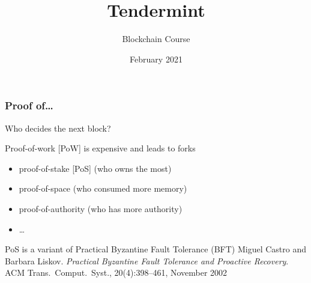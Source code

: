 \documentclass[11pt]{beamer}  %
\subtitle{Blockchain Course}
\title{Tendermint}
\institute{Universit\`a di Verona, Italy}
\date{February 2021}
\begin{document}
\begin{frame}
  \titlepage
\end{frame}

\begin{frame}
  \frametitle{Proof of\ldots}

  \begin{center}
    Who decides the next block?
  \end{center}

  \bigskip

  \begin{greenbox}{Proof-of-work [PoW] is expensive and leads to forks}
    \begin{itemize}
    \item proof-of-stake [PoS] (who owns the most)
    \item proof-of-space (who consumed more memory)
    \item proof-of-authority (who has more authority)
    \item \ldots
    \end{itemize}
  \end{greenbox}

  \bigskip

  \begin{greenbox}{PoS is a variant of Practical Byzantine Fault Tolerance (BFT)}
    Miguel Castro and Barbara Liskov.
    \emph{Practical Byzantine Fault Tolerance and Proactive Recovery}.
    ACM Trans.\ Comput.\ Syst., 20(4):398–461, November 2002
  \end{greenbox}

\end{frame}
\end{document}
